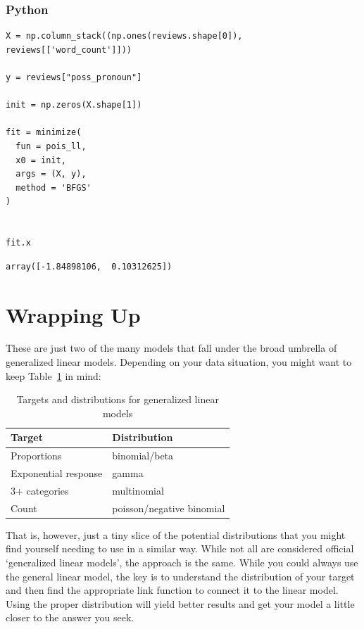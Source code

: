 \documentclass[
  letterpaper,
]{krantz}
\begin{document}
\subsubsection{Python}

\begin{verbatim}
X = np.column_stack((np.ones(reviews.shape[0]), reviews[['word_count']]))

y = reviews["poss_pronoun"]

init = np.zeros(X.shape[1])

fit = minimize(
  fun = pois_ll,
  x0 = init,
  args = (X, y),
  method = 'BFGS'
)


fit.x
\end{verbatim}

\begin{verbatim}
array([-1.84898106,  0.10312625])
\end{verbatim}

\section{Wrapping Up}\label{sec-glm-wrap}

These are just two of the many models that fall under the broad umbrella
of generalized linear models. Depending on your data situation, you
might want to keep Table~\ref{tbl-glm-models} in mind:

\hypertarget{tbl-glm-models}{}
\begin{longtable}{ll}
\caption{\label{tbl-glm-models}Targets and distributions for generalized linear models }\tabularnewline

\toprule
Target & Distribution \\ 
\midrule\addlinespace[2.5pt]
Proportions & binomial/beta \\ 
Exponential response & gamma \\ 
3+ categories & multinomial \\ 
Count & poisson/negative binomial \\ 
\bottomrule
\end{longtable}

That is, however, just a tiny slice of the potential distributions that
you might find yourself needing to use in a similar way. While not all
are considered official `generalized linear models', the approach is the
same. While you could always use the general linear model, the key is to
understand the distribution of your target and then find the appropriate
link function to connect it to the linear model. Using the proper
distribution will yield better results and get your model a little
closer to the answer you seek.
\end{document}
